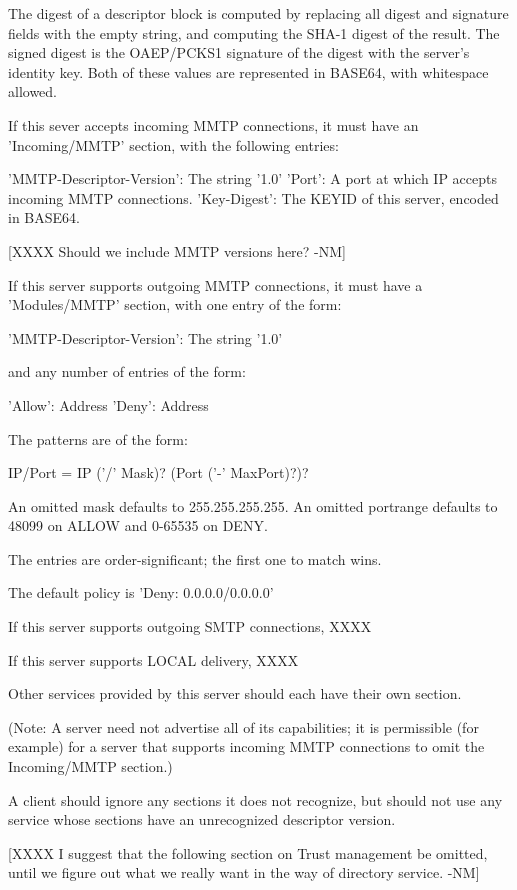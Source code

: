 The digest of a descriptor block is computed by replacing all digest
and signature fields with the empty string, and computing the SHA-1
digest of the result.  The signed digest is the OAEP/PCKS1 signature
of the digest with the server's identity key.  Both of these values
are represented in BASE64, with whitespace allowed.

If this sever accepts incoming MMTP connections, it must have an
'Incoming/MMTP' section, with the following entries:

     'MMTP-Descriptor-Version': The string '1.0'
     'Port': A port at which IP accepts incoming MMTP connections.
     'Key-Digest': The KEYID of this server, encoded in BASE64.

[XXXX Should we include MMTP versions here? -NM]

If this server supports outgoing MMTP connections, it must have a
'Modules/MMTP' section, with one entry of the form:

      'MMTP-Descriptor-Version': The string '1.0'

and any number of entries of the form:

      'Allow': Address
      'Deny': Address

The patterns are of the form:

   IP/Port = IP ('/' Mask)? (Port ('-' MaxPort)?)?

An omitted mask defaults to 255.255.255.255.  An omitted portrange
defaults to 48099 on ALLOW and 0-65535 on DENY.

The entries are order-significant; the first one to match wins.

The default policy is 'Deny: 0.0.0.0/0.0.0.0'

If this server supports outgoing SMTP connections, XXXX

If this server supports LOCAL delivery, XXXX

Other services provided by this server should each have their own section.

(Note: A server need not advertise all of its capabilities; it is
permissible (for example) for a server that supports incoming MMTP
connections to omit the Incoming/MMTP section.)

A client should ignore any sections it does not recognize, but should
not use any service whose sections have an unrecognized descriptor
version.

[XXXX I suggest that the following section on Trust management be
  omitted, until we figure out what we really want in the way of
  directory service. -NM]

